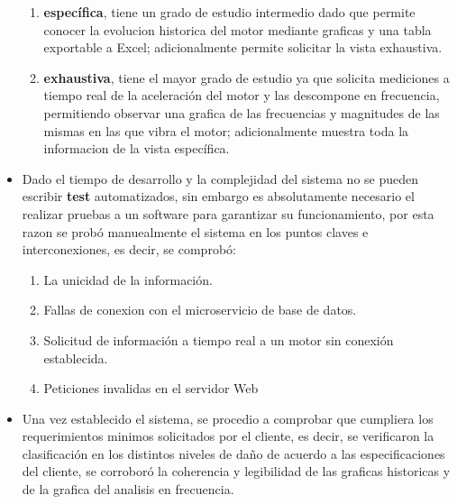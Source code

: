 \begin{itemize}
\begin{enumerate}
            \item \textbf{específica}, tiene un grado de estudio intermedio dado que
                permite conocer la evolucion historica del motor mediante graficas
                y una tabla exportable a Excel; adicionalmente permite solicitar
                la vista exhaustiva.
            \item \textbf{exhaustiva}, tiene el mayor grado de estudio ya que
                solicita mediciones a tiempo real de la aceleración del motor
                y las descompone en frecuencia, permitiendo observar una grafica
                de las frecuencias y magnitudes de las mismas en las que vibra
                el motor; adicionalmente muestra toda la informacion de la
                vista específica.
        \end{enumerate}
    \item Dado el tiempo de desarrollo y la complejidad del sistema no se
        pueden escribir \textbf{test} automatizados, sin embargo es absolutamente
        necesario el realizar pruebas a un software para garantizar su funcionamiento,
        por esta razon se probó manuealmente el sistema en los puntos claves
        e interconexiones, es decir, se comprobó:
        \begin{enumerate}
            \item La unicidad de la información.
            \item Fallas de conexion con el microservicio de base de datos.
            \item Solicitud de información a tiempo real a un motor sin conexión
                establecida.
            \item Peticiones invalidas en el servidor Web
        \end{enumerate}
    \item Una vez establecido el sistema, se procedio a comprobar que cumpliera
        los requerimientos minimos solicitados por el cliente, es decir, se
        verificaron la clasificación en los distintos niveles de daño de acuerdo
        a las especificaciones del cliente, se corroboró la coherencia y legibilidad
        de las graficas historicas y de la grafica del analisis en frecuencia.
\end{itemize}



